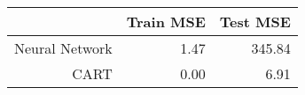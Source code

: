 \begin{table}[ht]
\centering
\begin{tabular}{rrr}
  \hline
 & Train MSE & Test MSE \\ 
  \hline
Neural Network & 1.47 & 345.84 \\ 
  CART & 0.00 & 6.91 \\ 
   \hline
\end{tabular}
\end{table}
